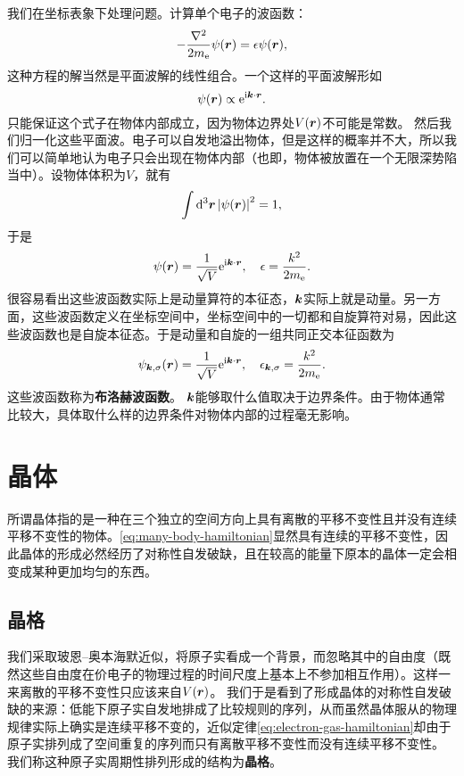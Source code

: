 \documentclass[hyperref, UTF8, a4paper]{ctexart}
\newcommand*{\ii}{\mathrm{i}}
\newcommand*{\ee}{\mathrm{e}}
\begin{document}
我们在坐标表象下处理问题。计算单个电子的波函数：
\[
    - \frac{\laplacian}{2m_\text{e}} \psi(\vb*{r}) = \epsilon \psi(\vb*{r}),
\]
这种方程的解当然是平面波解的线性组合。一个这样的平面波解形如
\[
    \psi(\vb*{r}) \propto \ee^{\ii \vb*{k} \cdot \vb*{r}}.
\]
只能保证这个式子在物体内部成立，因为物体边界处$V(\vb*{r})$不可能是常数。
然后我们归一化这些平面波。电子可以自发地溢出物体，但是这样的概率并不大，所以我们可以简单地认为电子只会出现在物体内部（也即，物体被放置在一个无限深势陷当中）。设物体体积为$V$，就有
\[
    \int \dd[3]{\vb*{r}} \abs{\psi(\vb*{r})}^2 = 1,
\]
于是
\[
    \psi (\vb*{r}) = \frac{1}{\sqrt{V}} \ee^{\ii \vb*{k} \cdot \vb*{r}}, \quad \epsilon = \frac{k^2}{2m_\text{e}}.
\]
很容易看出这些波函数实际上是动量算符的本征态，$\vb*{k}$实际上就是动量。另一方面，这些波函数定义在坐标空间中，坐标空间中的一切都和自旋算符对易，因此这些波函数也是自旋本征态。于是动量和自旋的一组共同正交本征函数为
\begin{equation}
    \psi_{\vb*{k},\sigma} (\vb*{r}) = \frac{1}{\sqrt{V}} \ee^{\ii \vb*{k} \cdot \vb*{r}}, \quad \epsilon_{\vb*{k},\sigma} = \frac{k^2}{2m_\text{e}}.
    \label{eq:bloch-wavefunction}
\end{equation}
这些波函数称为\textbf{布洛赫波函数}。
$\vb*{k}$能够取什么值取决于边界条件。由于物体通常比较大，具体取什么样的边界条件对物体内部的过程毫无影响。


\section{晶体}

所谓晶体指的是一种在三个独立的空间方向上具有离散的平移不变性且并没有连续平移不变性的物体。\eqref{eq:many-body-hamiltonian}显然具有连续的平移不变性，因此晶体的形成必然经历了对称性自发破缺，且在较高的能量下原本的晶体一定会相变成某种更加均匀的东西。

\subsection{晶格}

我们采取玻恩–奥本海默近似，将原子实看成一个背景，而忽略其中的自由度（既然这些自由度在价电子的物理过程的时间尺度上基本上不参加相互作用）。这样一来离散的平移不变性只应该来自$V(\vb*{r})$。
我们于是看到了形成晶体的对称性自发破缺的来源：低能下原子实自发地排成了比较规则的序列，从而虽然晶体服从的物理规律实际上确实是连续平移不变的，近似定律\eqref{eq:electron-gas-hamiltonian}却由于原子实排列成了空间重复的序列而只有离散平移不变性而没有连续平移不变性。
我们称这种原子实周期性排列形成的结构为\textbf{晶格}。
\end{document}
